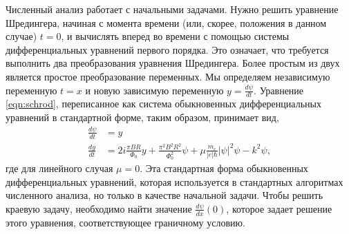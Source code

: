 \documentclass[A4,12pt,oneside]{article}
\renewcommand{\(}{\left(}
\renewcommand{\)}{\right)}
\begin{document}
Численный анализ работает с начальными задачами. Нужно решить уравнение Шредингера, начиная с момента времени (или, скорее, положения в данном случае) $ t = 0$, и вычислять вперед во времени с помощью системы дифференциальных уравнений первого порядка. Это означает, что требуется выполнить два преобразования уравнения Шредингера. Более простым из двух является простое преобразование переменных. Мы определяем независимую переменную $t = x$ и новую зависимую переменную $y = \frac{d\psi}{dt}$. Уравнение \ref{eqn:schrod}, переписанное как система обыкновенных дифференциальных уравнений в стандартной форме, таким образом, принимает вид,
\begin{align}
\frac{d\psi}{dt} & = y\\
\frac{dy}{dt} & = 2 i \frac{\pi BR}{\Phi_0} y + \frac{\pi^2 B^2R^2}{\Phi^2_0}  \psi + \mu \frac{m_e}{\left|e\right|\hbar} \left|\psi\right|^2 \psi -k^2 \psi,
\end{align} 
где для линейного случая $\mu = 0$. Эта стандартная форма обыкновенных дифференциальных уравнений, которая используется в стандартных алгоритмах численного анализа, но только в качестве начальной задачи. Чтобы решить краевую задачу, необходимо найти значение $\frac{d\psi}{dx}\left(0\right)$, которое задает решение этого уравнения, соответствующее граничному условию.
\end{document}
